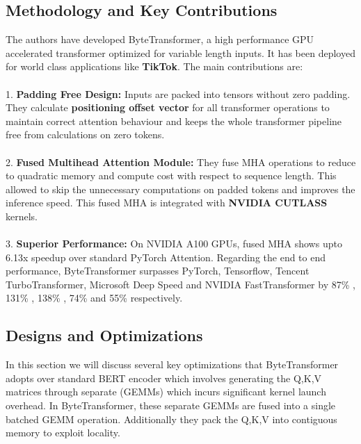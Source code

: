 \documentclass{article}
\begin{document}
\subsection*{Methodology and Key Contributions}
The authors have developed ByteTransformer, a high performance GPU accelerated transformer optimized for variable length inputs. It has been deployed for world class applications like \textbf{TikTok}. The main contributions are: \\ \\
1. \textbf{Padding Free Design: } Inputs are packed into tensors without zero padding. They calculate \textbf{positioning offset vector} for all transformer operations to maintain correct attention behaviour and keeps the whole transformer pipeline free from calculations on zero tokens. \\ \\
2. \textbf{Fused Multihead Attention Module: }They fuse MHA operations to reduce to quadratic memory and compute cost with respect to sequence length. This allowed to skip the unnecessary computations on padded tokens and improves the inference speed. This fused MHA is integrated with \textbf{NVIDIA CUTLASS} kernels. \\ \\
3. \textbf{Superior Performance: }On NVIDIA A100 GPUs, fused MHA shows upto 6.13x speedup over standard PyTorch Attention. Regarding the end to end performance, ByteTransformer surpasses PyTorch, Tensorflow, Tencent TurboTransformer, Microsoft Deep Speed and NVIDIA FastTransformer by 87\% , 131\% , 138\% , 74\% and 55\% respectively. 

\subsection*{Designs and Optimizations}
In this section we will discuss several key optimizations that ByteTransformer adopts over standard BERT encoder which involves generating the Q,K,V matrices through separate (GEMMs) which incurs significant kernel launch overhead. In ByteTransformer, these separate GEMMs are fused into a single batched GEMM operation. Additionally they pack the Q,K,V into contiguous memory to exploit locality.
\end{document}
